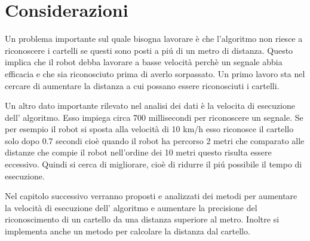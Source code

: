 \section{Considerazioni}

	Un problema importante sul quale bisogna lavorare è che l'algoritmo non riesce a riconoscere i cartelli se questi sono posti a pi\'u di un metro di distanza. Questo implica che il robot debba lavorare a basse velocità perchè un segnale abbia efficacia e che sia riconosciuto prima di averlo sorpassato. Un primo lavoro sta nel cercare di aumentare la distanza a cui possano essere riconosciuti i cartelli.

	Un altro dato importante rilevato nel analisi dei dati è la velocita di esecuzione dell' algoritmo. Esso impiega circa 700 millisecondi per riconoscere un segnale. Se per esempio il robot si sposta alla velocità di 10 km/h esso riconosce il cartello solo dopo 0.7 secondi cioè quando il robot ha percorso 2 metri che comparato alle distanze che compie il robot nell'ordine dei 10 metri questo risulta essere eccessivo. Quindi si cerca di migliorare, cioè di ridurre il pi\'u possibile il tempo di esecuzione.
	
	Nel capitolo successivo verranno proposti e analizzati dei metodi per aumentare la velocità di esecuzione dell' algoritmo e aumentare la precisione del riconoscimento di un cartello da una distanza superiore al metro. Inoltre si implementa anche un metodo per calcolare la distanza dal cartello.